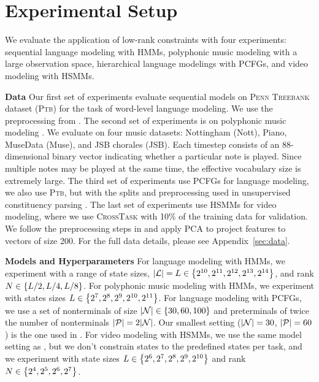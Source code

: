 \documentclass{article}
\begin{document}
\section{Experimental Setup}
\label{sec:experiments}
We evaluate the application of low-rank constraints with four experiments: sequential language modeling with HMMs, polyphonic music modeling with a large observation space, hierarchical language modelings with PCFGs, and video modeling with HSMMs.

\textbf{Data}
Our first set of experiments evaluate sequential models on \textsc{Penn Treebank} dataset (\textsc{Ptb}) \citep{ptb} for the task of word-level language modeling.
We use the preprocessing from \citet{mikolov-2011}. The second set of experiments is on polyphonic music modeling \citep{polyphonic}.
We evaluate on four music datasets: Nottingham (Nott), Piano, MuseData (Muse), and JSB chorales (JSB).
Each timestep consists of an 88-dimensional binary vector indicating whether a particular note is played. Since multiple notes may be played at the same time, the effective vocabulary size is extremely large. The third set of experiments use PCFGs for language modeling, we also use \textsc{Ptb}, but with the splits and preprocessing used in unsupervised constituency parsing \citep{shen2018prpn,shen2018ordered,kim2019cpcfg}. The last set of experiments use HSMMs for video modeling, where we use \textsc{CrossTask} \citep{zhukov2019cross} with 10\% of the training data for validation. We follow the preprocessing steps in \citet{fried2020learning} and apply PCA to project features to vectors of size 200. For the full data details, please see Appendix~\ref{sec:data}.

\textbf{Models and Hyperparameters}
For language modeling with HMMs, we experiment with a range of state sizes, $|\mathcal{L}| = L \in \left\{2^{10}, 2^{11}, 2^{12}, 2^{13}, 2^{14}\right\}$,
and rank $N \in \left\{L/2, L/4, L/8\right\}$.
For polyphonic music modeling with HMMs, we experiment with states sizes $L \in \left\{2^7, 2^8, 2^9, 2^{10}, 2^{11}\right\}$.
For language modeling with PCFGs, we use a set of nonterminals of size $|\mathcal{N}| \in \left\{30, 60, 100\right\}$ and preterminals of twice the number of nonterminals $|\mathcal{P}|=2|\mathcal{N}|$. Our smallest setting ($|\mathcal{N}|=30$, $|\mathcal{P}|=60$) is the one used in \citet{kim2019cpcfg}. For video modeling with HSMMs, we use the same model setting as \citet{fried2020learning}, but we don't constrain states to the predefined states per task, and we experiment with state sizes $L \in \left\{2^6, 2^7, 2^8, 2^9, 2^{10}\right\}$ and rank $N \in \left\{2^4, 2^5, 2^6, 2^7\right\}$.
\end{document}

